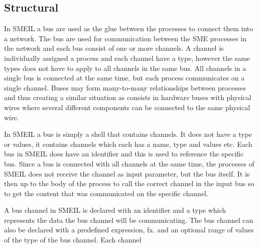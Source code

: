 \subsection{Structural}

In SMEIL a bus are used as the glue between the processes to connect them into a network. The bus are used for communication between the SME processes in the network and each bus consist of one or more channels. A channel is individually assigned a process and each channel have a type, however the same types does not have to apply to all channels in the same bus. All channels in a single bus is connected at the same time, but each process communicates on a single channel.
Buses may form many-to-many relationships between processes and thus creating a similar situation as consists in hardware buses with physical wires where several different components can be connected to the same physical wire.

In SMEIL a bus is simply a shell that contains channels. It does not have a type or values, it contains channels which each has a name, type and values etc. Each bus in SMEIL does have an identifier and this is used to reference the specific bus.
Since a bus is connected with all channels at the same time, the processes of SMEIL does not receive the channel as input parameter, but the bus itself. It is then up to the body of the process to call the correct channel in the input bus so to get the content that was communicated on the specific channel.




A bus channel in SMEIL is declared with an identifier and a type which represents the data the bus channel will be communicating. The bus channel can also be declared with a predefined expression, fx. %
and an optional range of values of the type of the bus channel.
Each channel


